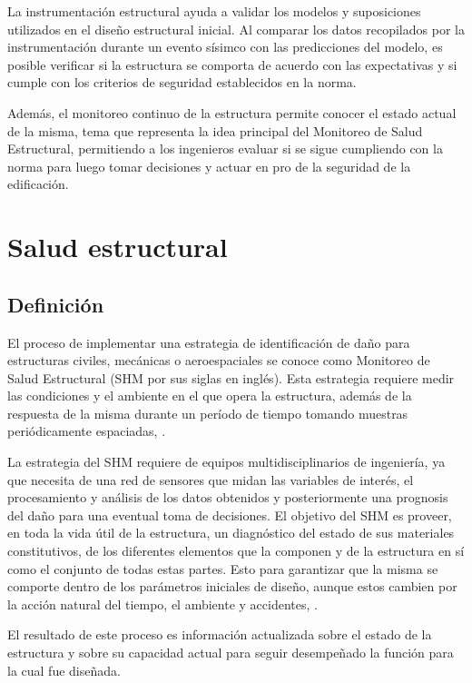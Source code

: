 La instrumentación estructural ayuda a validar los modelos y suposiciones utilizados en el diseño estructural inicial. Al comparar los datos recopilados por la instrumentación durante un evento sísimco con las predicciones del modelo, es posible verificar si la estructura se comporta de acuerdo con las expectativas y si cumple con los criterios de seguridad establecidos en la norma.

Además, el monitoreo continuo de la estructura permite conocer el estado actual de la misma, tema que representa la idea principal del Monitoreo de Salud Estructural, permitiendo a los ingenieros evaluar si se sigue cumpliendo con la norma para luego tomar decisiones y actuar en pro de la seguridad de la edificación.


\section{Salud estructural}

\subsection{Definición}


El proceso de implementar una estrategia de identificación de daño para estructuras civiles, mecánicas o aeroespaciales se conoce como Monitoreo de Salud Estructural (SHM por sus siglas en inglés). Esta estrategia requiere medir las condiciones y el ambiente en el que opera la estructura, además de la respuesta de la misma durante un período de tiempo tomando muestras periódicamente espaciadas, \citep{farrar2007introduction}.


La estrategia del SHM requiere de equipos multidisciplinarios de ingeniería, ya que necesita de una red de sensores que midan las variables de interés, el procesamiento y análisis de los datos obtenidos y posteriormente una prognosis del daño para una eventual toma de decisiones. El objetivo del SHM es proveer, en toda la vida útil de la estructura, un diagnóstico del estado de sus materiales constitutivos, de los diferentes elementos que la componen y de la estructura en sí como el conjunto de todas estas partes. Esto para garantizar que la misma se comporte dentro de los parámetros iniciales de diseño, aunque estos cambien por la acción natural del tiempo, el ambiente y accidentes, \citep{balageas2010structural}.

El resultado de este proceso es información actualizada sobre el estado de la estructura y sobre su capacidad actual para seguir desempeñado la función para la cual fue diseñada.


